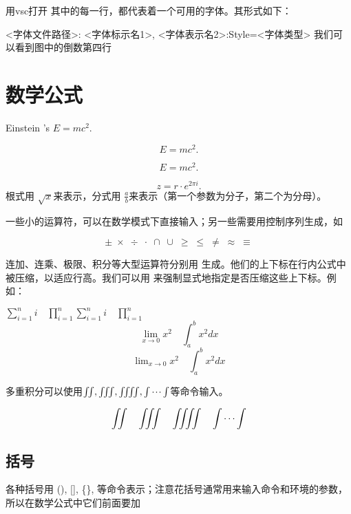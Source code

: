 \documentclass[UTF8]{ctexart}
\begin{document}
	用vsc打开
	其中的每一行，都代表着一个可用的字体。其形式如下：
	
	<字体文件路径>: <字体标示名1>, <字体表示名2>:Style=<字体类型>
	我们可以看到图中的倒数第四行
	
	
	\section{数学公式}
	
	
	Einstein 's $E=mc^2$.
	
	\[ E=mc^2. \]
	
	\begin{equation}
	E=mc^2.
	\end{equation}
	
	\[ z = r\cdot e^{2\pi i}. \]
	根式用 $\sqrt{x} $来表示，分式用 $\frac{a}{b} $来表示（第一个参数为分子，第二个为分母）。
	
	一些小的运算符，可以在数学模式下直接输入；另一些需要用控制序列生成，如
	
	\[ \pm\; \times\; \div\; \cdot\; \cap\; \cup\; \geq\; \leq\; \neq\; \approx \; \equiv \]
	
	连加、连乘、极限、积分等大型运算符分别用 %
	生成。他们的上下标在行内公式中被压缩，以适应行高。我们可以用 %
	来强制显式地指定是否压缩这些上下标。例如：
	
	$ \sum_{i=1}^n i\quad \prod_{i=1}^n  \sum\limits _{i=1}^n i\quad \prod\limits _{i=1}^n $
	\[ \lim_{x\to0}x^2 \quad \int_a^b x^2 dx \]
	\[ \lim\nolimits _{x\to0}x^2\quad \int\nolimits_a^b x^2 dx \]
	
	多重积分可以使用$ \iint, \iiint, \iiiint, \idotsint $等命令输入。
	
	\[ \iint\quad \iiint\quad \iiiint\quad \idotsint \]
	
	\subsection{括号}
	各种括号用 (), [], \{\},%
	等命令表示；注意花括号通常用来输入命令和环境的参数，所以在数学公式中它们前面要加 %
	
\end{document}
